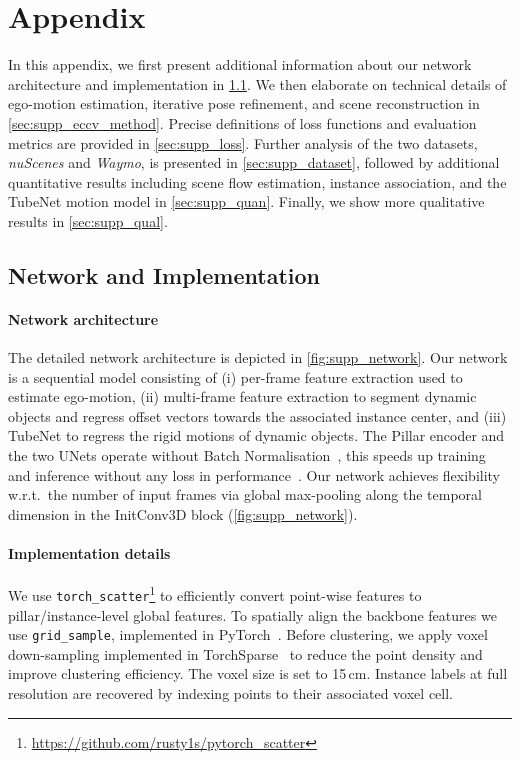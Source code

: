 \section{Appendix}
In this appendix, we first present additional information about our network architecture and implementation in \cref{sec:supp_network}. We then elaborate on technical details of ego-motion estimation, iterative pose refinement, and scene reconstruction in \cref{sec:supp_eccv_method}. Precise definitions of loss functions and evaluation metrics are provided in \cref{sec:supp_loss}. Further analysis of the two datasets, \emph{nuScenes} and \emph{Waymo}, is presented in \cref{sec:supp_dataset}, followed by additional quantitative results including scene flow estimation, instance association, and the TubeNet motion model in \cref{sec:supp_quan}. Finally, we show more qualitative results in \cref{sec:supp_qual}. 

\subsection{Network and Implementation}
\label{sec:supp_network}

\paragraph{Network architecture}
The detailed network architecture is depicted in \cref{fig:supp_network}. Our network is a sequential model consisting of (i) per-frame feature extraction used to estimate ego-motion, (ii) multi-frame feature extraction to segment dynamic objects and regress offset vectors towards the associated instance center, and (iii) TubeNet to regress the rigid motions of dynamic objects. The Pillar encoder and the two UNets operate without Batch Normalisation~\cite{ioffe2015batch}, this speeds up training and inference without any loss in performance~\cite{peng2020convolutional}. Our network achieves flexibility w.r.t.\ the number of input frames via global max-pooling along the temporal dimension in the InitConv3D block (\cref{fig:supp_network}).

\paragraph{Implementation details}
We use \texttt{torch\_scatter}\footnote{\url{https://github.com/rusty1s/pytorch_scatter}} to efficiently convert point-wise features to pillar/instance-level global features. To spatially align the backbone features we use \texttt{grid\_sample}, implemented in PyTorch~\cite{NEURIPS2019_9015}. Before clustering, we apply voxel down-sampling implemented in TorchSparse~\cite{tang2022torchsparse} to reduce the point density and improve clustering efficiency. The voxel size is set to 15$\,$cm. Instance labels at full resolution are recovered by indexing points to their associated voxel cell. 

